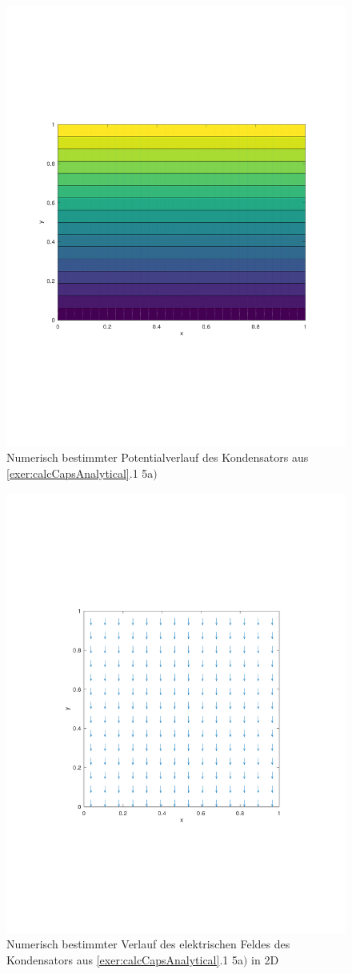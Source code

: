 \documentclass[Protokollheft.tex]{subfiles}
\begin{document}
\begin{figure}[h!]
	\centering
	\includegraphics[trim = 20mm 70mm 20mm 70mm, clip,width=0.7\linewidth]{potential_A.pdf}
	\caption{Numerisch bestimmter Potentialverlauf des Kondensators aus \ref{exer:calcCapsAnalytical}.1 5a$)$}
	\label{fig:potA}
\end{figure}

\begin{figure}[h!]
	\centering
	\includegraphics[trim = 20mm 70mm 20mm 70mm, clip,width=0.7\linewidth]{E_2D_A.pdf}
	\caption{Numerisch bestimmter Verlauf des elektrischen Feldes des Kondensators aus \ref{exer:calcCapsAnalytical}.1 5a$)$ in 2D}
	\label{fig:potA}
\end{figure}
\end{document}
